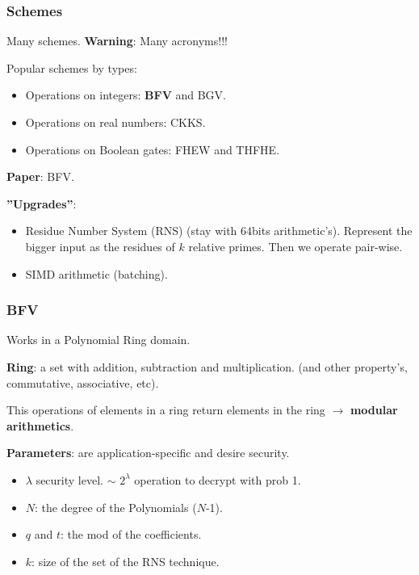 \documentclass[10pt,handout]{beamer}
\begin{document}
\begin{frame}
    \frametitle{Schemes}

    Many schemes. \textbf{Warning}: Many acronyms!!!

    Popular schemes by types:
    \begin{itemize}\vspace{-0.2cm}
        \item Operations on integers: \textbf{BFV} and BGV.\vspace{-0.2cm}
        \item Operations on real numbers: CKKS.\vspace{-0.2cm}
        \item Operations on Boolean gates: FHEW and THFHE.
    \end{itemize}

    \textbf{Paper}: BFV.

    \textbf{''Upgrades''}:
\begin{itemize}\vspace{-0.2cm}
    \item Residue Number System (RNS) (stay with 64bits arithmetic's).        Represent the bigger input as the residues of $k$ relative primes.
        Then we operate pair-wise.
 \vspace{-0.2cm}
   \item SIMD arithmetic (batching).
\end{itemize}


\end{frame}



\begin{frame}
    \frametitle{BFV}

Works in a Polynomial Ring domain.

\textbf{Ring}: a set with addition, subtraction and multiplication. (and other property's, commutative, associative, etc).

    This operations of elements in a ring return elements in the ring $\rightarrow$  \textbf{modular arithmetics}.

\textbf{Parameters}: are application-specific and desire security.

\begin{itemize}
    \item $\lambda$ security level. $\sim$ $2^\lambda$ operation to decrypt with prob 1.
    \item $N$: the degree of the Polynomials ($N$-1).
    \item $q$ and $t$: the mod of the coefficients.
    \item $k$: size of the set of the RNS technique.
\end{itemize}


\end{frame}
\end{document}
